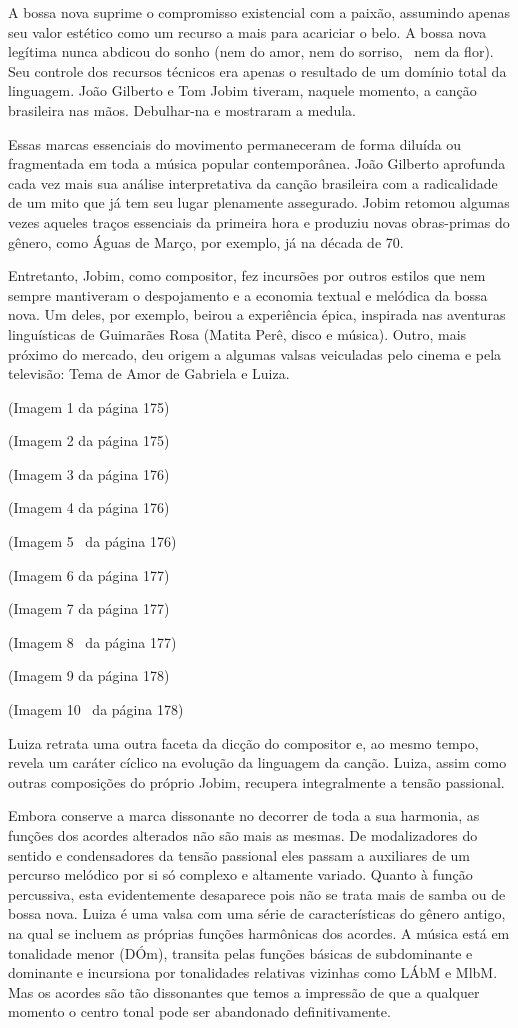 A bossa nova suprime o compromisso existencial com a paixão, assumindo
apenas seu valor estético como um recurso a mais para acariciar o belo.
A bossa nova legítima nunca abdicou do sonho (nem do amor, nem do
sorriso,~ nem da flor). Seu controle dos recursos técnicos era apenas o
resultado de um domínio total da linguagem. João Gilberto e Tom Jobim
tiveram, naquele momento, a canção brasileira nas mãos. Debulhar-na e
mostraram a medula.

Essas marcas essenciais do movimento permaneceram de forma diluída ou
fragmentada em toda a música popular contemporânea. João Gilberto
aprofunda cada vez mais sua análise interpretativa da canção brasileira
com a radicalidade de um mito que já tem seu lugar plenamente
assegurado. Jobim retomou algumas vezes aqueles traços essenciais da
primeira hora e produziu novas obras-primas do gênero, como Águas de
Março, por exemplo, já na década de 70.

Entretanto, Jobim, como compositor, fez incursões por outros estilos que
nem sempre mantiveram o despojamento e a economia textual e melódica da
bossa nova. Um deles, por exemplo, beirou a experiência épica, inspirada
nas aventuras linguísticas de Guimarães Rosa (Matita Perê, disco e
música). Outro, mais próximo do mercado, deu origem a algumas valsas
veiculadas pelo cinema e pela televisão: Tema de Amor de Gabriela e
Luiza.~

(Imagem 1 da página 175)

(Imagem 2 da página 175)

(Imagem 3 da página 176)

(Imagem 4 da página 176)

(Imagem 5~ da página 176)

(Imagem 6 da página 177)

(Imagem 7 da página 177)

(Imagem 8~ da página 177)

(Imagem 9 da página 178)

(Imagem 10~ da página 178)

Luiza retrata uma outra faceta da dicção do compositor e, ao mesmo
tempo, revela um caráter cíclico na evolução da linguagem da canção.
Luiza, assim como outras composições do próprio Jobim, recupera
integralmente a tensão passional.

Embora conserve a marca dissonante no decorrer de toda a sua harmonia,
as funções dos acordes alterados não são mais as mesmas. De
modalizadores do sentido e condensadores da tensão passional eles passam
a auxiliares de um percurso melódico por si só complexo e altamente
variado. Quanto à função percussiva, esta evidentemente desaparece pois
não se trata mais de samba ou de bossa nova. Luiza é uma valsa com uma
série de características do gênero antigo, na qual se incluem as
próprias funções harmônicas dos acordes. A música está em tonalidade
menor (DÓm), transita pelas funções básicas de subdominante e dominante
e incursiona por tonalidades relativas vizinhas como LÁbM e MlbM. Mas os
acordes são tão dissonantes que temos a impressão de que a qualquer
momento o centro tonal pode ser abandonado definitivamente.

